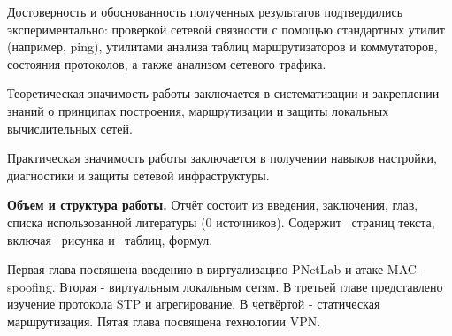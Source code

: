 Достоверность и обоснованность полученных результатов подтвердились экспериментально: проверкой сетевой связности с помощью стандартных утилит (например, ping), утилитами анализа таблиц маршрутизаторов и коммутаторов, состояния протоколов, а также анализом сетевого трафика.

Теоретическая значимость работы заключается в систематизации и закреплении знаний о принципах построения, маршрутизации и защиты локальных вычислительных сетей.

Практическая значимость работы заключается в получении навыков настройки, диагностики и защиты сетевой инфраструктуры.

\textbf{Объем и структура работы.} Отчёт состоит из введения, заключения,  глав, списка использованной литературы (0 источников). Содержит \ztotpages\ страниц текста, включая \totalfigures\ рисунка и \totaltables\ таблиц,  формул.

Первая глава посвящена введению в виртуализацию PNetLab и атаке MAC-spoofing. Вторая - виртуальным локальным сетям. В третьей главе представлено изучение протокола STP и агрегирование. В четвёртой - статическая маршрутизация. Пятая глава посвящена технологии VPN.
